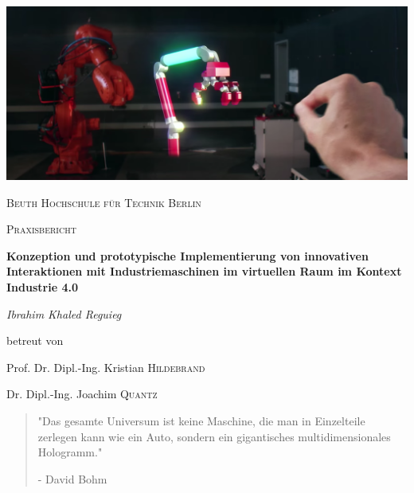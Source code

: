 \documentclass[a4paper,12pt]{scrartcl}
\begin{document}
	
	\begin{titlepage}
		\centering
		\includegraphics[width=1.0\textwidth]{figuren/HoloLens_CompanyVideo_2016_11_24_10_13_20}\par\vspace{1cm}
		{\scshape\LARGE Beuth Hochschule für Technik Berlin \par}
		\vspace{1cm}
		{\scshape\Large Praxisbericht\par}
		\vspace{1.5cm}
		{\huge\bfseries Konzeption und prototypische Implementierung von innovativen Interaktionen mit Industriemaschinen im virtuellen Raum im Kontext Industrie 4.0\par}
		\vspace{2cm}
		{\Large\itshape Ibrahim Khaled Reguieg\par}
		\vfill
		betreut von\par
		Prof. Dr. Dipl.-Ing. Kristian \textsc{Hildebrand}
		
		Dr. Dipl.-Ing. Joachim \textsc{Quantz}
		\vfill	
	\end{titlepage}
	
	\tableofcontents
	
	\newpage
	\vspace*{\fill}
	\begin{quote}
		"Das gesamte Universum ist keine Maschine, die man in Einzelteile zerlegen kann wie ein Auto, sondern ein gigantisches multidimensionales Hologramm."
		
		- David Bohm 
	\end{quote}
	\vspace*{\fill}
	\newpage
\end{document}
